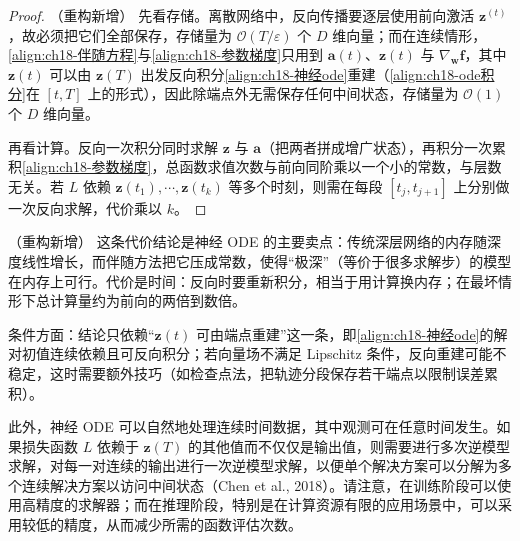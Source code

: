 \documentclass[../../main.tex]{subfiles}
\begin{document}
\begin{proof}（重构新增）
先看存储。离散网络中，反向传播要逐层使用前向激活 $\bm{z}^{(t)}$，故必须把它们全部保存，存储量为 $\mathcal{O}(T/\varepsilon)$ 个 $D$ 维向量；而在连续情形，\eqref{align:ch18-伴随方程}与\eqref{align:ch18-参数梯度}只用到 $\bm{a}(t)$、$\bm{z}(t)$ 与 $\nabla_{\bm{w}}\bm{f}$，其中 $\bm{z}(t)$ 可以由 $\bm{z}(T)$ 出发反向积分\eqref{align:ch18-神经ode}重建（\eqref{align:ch18-ode积分}在 $[t,T]$ 上的形式），因此除端点外无需保存任何中间状态，存储量为 $\mathcal{O}(1)$ 个 $D$ 维向量。

再看计算。反向一次积分同时求解 $\bm{z}$ 与 $\bm{a}$（把两者拼成增广状态），再积分一次累积\eqref{align:ch18-参数梯度}，总函数求值次数与前向同阶乘以一个小的常数，与层数无关。若 $L$ 依赖 $\bm{z}(t_1),\cdots,\bm{z}(t_k)$ 等多个时刻，则需在每段 $[t_j,t_{j+1}]$ 上分别做一次反向求解，代价乘以 $k$。
\end{proof}

\begin{remark}（重构新增）
这条代价结论是神经 ODE 的主要卖点：传统深层网络的内存随深度线性增长，而伴随方法把它压成常数，使得“极深”（等价于很多求解步）的模型在内存上可行。代价是时间：反向时要重新积分，相当于用计算换内存；在最坏情形下总计算量约为前向的两倍到数倍。

条件方面：结论只依赖“$\bm{z}(t)$ 可由端点重建”这一条，即\eqref{align:ch18-神经ode}的解对初值连续依赖且可反向积分；若向量场不满足 Lipschitz 条件，反向重建可能不稳定，这时需要额外技巧（如检查点法，把轨迹分段保存若干端点以限制误差累积）。
\end{remark}

此外，神经 ODE 可以自然地处理连续时间数据，其中观测可在任意时间发生。如果损失函数 $L$ 依赖于 $\bm{z}(T)$ 的其他值而不仅仅是输出值，则需要进行多次逆模型求解，对每一对连续的输出进行一次逆模型求解，以便单个解决方案可以分解为多个连续解决方案以访问中间状态（Chen et al., 2018）。请注意，在训练阶段可以使用高精度的求解器；而在推理阶段，特别是在计算资源有限的应用场景中，可以采用较低的精度，从而减少所需的函数评估次数。
\end{document}
